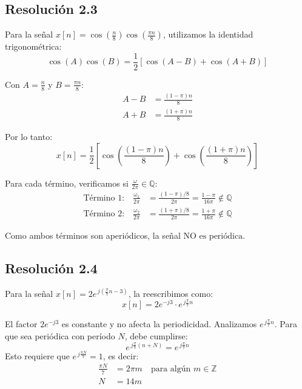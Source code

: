 \documentclass[
  11pt,
  letterpaper,
   addpoints,
   answers
  ]{exam}
\begin{document}
\begin{questions}
\begin{solution}
\subsection*{Resolución 2.3}

Para la señal $x[n] = \cos\!\left(\tfrac{n}{8}\right)\cos\!\left(\tfrac{\pi n}{8}\right)$, utilizamos la identidad trigonométrica:
\begin{equation}
\cos(A)\cos(B) = \frac{1}{2}[\cos(A-B) + \cos(A+B)]
\end{equation}

Con $A = \frac{n}{8}$ y $B = \frac{\pi n}{8}$:
\begin{align}
A - B &= \frac{(1-\pi)n}{8} \\
A + B &= \frac{(1+\pi)n}{8}
\end{align}

Por lo tanto:
\begin{equation}
x[n] = \frac{1}{2}\left[\cos\!\left(\frac{(1-\pi)n}{8}\right) + \cos\!\left(\frac{(1+\pi)n}{8}\right)\right]
\end{equation}

Para cada término, verificamos si $\frac{\omega}{2\pi} \in \mathbb{Q}$:
\begin{align}
\text{Término 1:} \quad \frac{\omega_1}{2\pi} &= \frac{(1-\pi)/8}{2\pi} = \frac{1-\pi}{16\pi} \notin \mathbb{Q} \\
\text{Término 2:} \quad \frac{\omega_2}{2\pi} &= \frac{(1+\pi)/8}{2\pi} = \frac{1+\pi}{16\pi} \notin \mathbb{Q}
\end{align}

Como ambos términos son aperiódicos, la señal $\boxed{\text{NO es periódica}}$.

\subsection*{Resolución 2.4}

Para la señal $x[n] = 2e^{\,j(\frac{\pi}{7}n-3)}$, la reescribimos como:
\begin{equation}
x[n] = 2e^{-j3} \cdot e^{\,j\frac{\pi}{7}n}
\end{equation}

El factor $2e^{-j3}$ es constante y no afecta la periodicidad. Analizamos $e^{\,j\frac{\pi}{7}n}$. Para que sea periódica con período $N$, debe cumplirse:
\begin{equation}
e^{\,j\frac{\pi}{7}(n+N)} = e^{\,j\frac{\pi}{7}n}
\end{equation}
Esto requiere que $e^{\,j\frac{\pi N}{7}} = 1$, es decir:
\begin{align}
\frac{\pi N}{7} &= 2\pi m \quad \text{para algún } m \in \mathbb{Z} \\
N &= 14m
\end{align}


\end{solution}
\end{questions}
\end{document}
